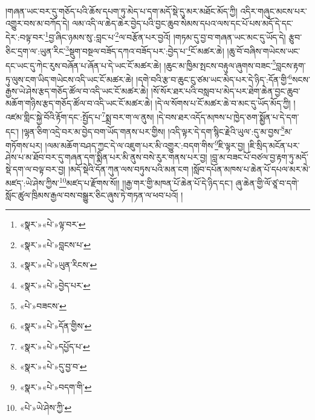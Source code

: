 །གཞན་ཡང་བར་དུ་གཅོད་པའི་ཆོས་དཔག་ཏུ་མེད་པ་དག་མདོ་སྡེ་དུ་མར་མཐོང་མོད་ཀྱི། འདིར་གཞུང་མངས་པར་འགྱུར་བས་མ་བཀོད་དེ། ལམ་འདི་ལ་ཆེད་ཆེར་བྱེད་པའི་བྱང་ཆུབ་སེམས་དཔའ་ལས་དང་པོ་པས་མདོ་དེ་དང་དེར་:བལྟ་བར་\footnote{«སྣར་»«པེ་»ལྟ་བར་}བྱ་ཞིང་ཉམས་སུ་:བླང་པ་\footnote{«སྣར་»«པེ་»བླངས་པ་}ལ་བརྩོན་པར་བྱའོ། །གཏམ་དུ་བྱ་བ་གཞན་ཡང་མང་དུ་ཡོད་དེ། རྩུབ་ཅིང་དྲག་ལ་:ཡུན་རིང་\footnote{«སྣར་»«པེ་»ཡུན་རིངས་}སྡུག་བསྔལ་བཟོད་དཀའ་བཟོད་པར་:བྱེད་པ་\footnote{«སྣར་»«པེ་»བྱེད་པར་}ངོ་མཚར་ཆེ། །ཆུ་བོ་བཞིས་གཡེངས་ཡང་དང་ཡང་དུ་ཀེང་རུས་བཞོན་པ་ཞོན་པ་དེ་ཡང་ངོ་མཚར་ཆེ། །ཆུང་མ་ཁྱིམ་སྤངས་བརྟུལ་ཞུགས་བཟང་\footnote{«པེ་»བཟངས་}བླངས་རྟག་ཏུ་ལུས་ངག་ཡིད་གཡེངས་འདི་ཡང་ངོ་མཚར་ཆེ། །དགེ་བའི་རྩ་བ་ཆུང་ངུ་ཙམ་ཡང་མེད་པར་དེ་ཉིད་:དོན་གྱི་\footnote{«སྣར་»«པེ་»དོན་གྱིས་}སངས་རྒྱས་ཡེ་ཤེས་རྩད་གཅོད་ཚོལ་བ་འདི་ཡང་ངོ་མཚར་ཆེ། །སོ་སོར་ཐར་པའི་བསླབ་པ་མེད་པར་ཐེག་ཆེན་བྱང་ཆུབ་མཆོག་གཉིས་རྩད་གཅོད་ཚོལ་བ་འདི་ཡང་ངོ་མཚར་ཆེ། །དེ་ལ་སོགས་པ་ངོ་མཚར་ཆེ་བ་མང་དུ་ཡོད་མོད་ཀྱི། །འཛམ་གླིང་སྐྱེ་བོའི་རྟོག་དང་:སྤྱོད་པ་\footnote{«སྣར་»«པེ་»དཔྱོད་པ་}སྨྲ་བར་ག་ལ་ནུས། །དེ་བས་ཐར་འདོད་མཁས་པ་ཁྱེད་ཅག་སྨྱོན་པ་དེ་དག་དང་། །ལྷན་ཅིག་འདྲེ་བར་མ་བྱེད་བག་ཡོད་གནས་པར་གྱིས། །འདི་ལྟར་དེ་དག་སྙིང་རྗེའི་ཡུལ་:དུ་མ་བྱས་\footnote{«སྣར་»«པེ་»དུ་བྱ་བ་}མ་གཏོགས་པར། །ལམ་མཆོག་བཤད་ཀྱང་དེ་ལ་འཇུག་པར་མི་འགྱུར་:བདག་གིས་\footnote{«སྣར་»«པེ་»བདག་གི་}ཇི་ལྟར་བྱ། །ཇི་སྲིད་མངོན་པར་ཤེས་པ་མ་ཐོབ་བར་དུ་གཞན་དག་སྨིན་པར་མི་ནུས་བསེ་རུར་གནས་པར་བྱ། །བླ་མ་བཟང་པོ་བཙལ་བྱ་རྟག་ཏུ་མདོ་སྡེ་དག་ལ་བལྟ་བར་བྱ། །མདོ་སྡེའི་དོན་ཀུན་ལས་བཏུས་པའི་མན་ངག །སློབ་དཔོན་མཁས་པ་ཆེན་པོ་དཔལ་མར་མེ་མཛད་:ཡེ་ཤེས་ཀྱིས་\footnote{«པེ་»ཡེ་ཤེས་ཀྱི་}མཛད་པ་རྫོགས་སོ།། །།རྒྱ་གར་གྱི་མཁན་པོ་ཆེན་པོ་དེ་ཉིད་དང་། ཞུ་ཆེན་གྱི་ལོ་ཙཱ་བ་དགེ་སློང་ཚུལ་ཁྲིམས་རྒྱལ་བས་བསྒྱུར་ཅིང་ཞུས་ཏེ་གཏན་ལ་ཕབ་པའོ། ། 
